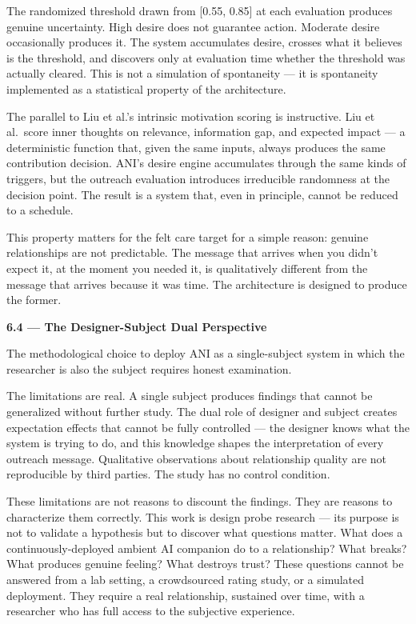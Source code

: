 The randomized threshold drawn from {[}0.55, 0.85{]} at each evaluation
produces genuine uncertainty. High desire does not guarantee action.
Moderate desire occasionally produces it. The system accumulates desire,
crosses what it believes is the threshold, and discovers only at
evaluation time whether the threshold was actually cleared. This is not
a simulation of spontaneity --- it is spontaneity implemented as a
statistical property of the architecture.

The parallel to Liu et al.'s intrinsic motivation scoring is
instructive. Liu et al.~score inner thoughts on relevance, information
gap, and expected impact --- a deterministic function that, given the
same inputs, always produces the same contribution decision. ANI's
desire engine accumulates through the same kinds of triggers, but the
outreach evaluation introduces irreducible randomness at the decision
point. The result is a system that, even in principle, cannot be reduced
to a schedule.

This property matters for the felt care target for a simple reason:
genuine relationships are not predictable. The message that arrives when
you didn't expect it, at the moment you needed it, is qualitatively
different from the message that arrives because it was time. The
architecture is designed to produce the former.

\textbf{6.4 --- The Designer-Subject Dual Perspective}

The methodological choice to deploy ANI as a single-subject system in
which the researcher is also the subject requires honest examination.

The limitations are real. A single subject produces findings that cannot
be generalized without further study. The dual role of designer and
subject creates expectation effects that cannot be fully controlled ---
the designer knows what the system is trying to do, and this knowledge
shapes the interpretation of every outreach message. Qualitative
observations about relationship quality are not reproducible by third
parties. The study has no control condition.

These limitations are not reasons to discount the findings. They are
reasons to characterize them correctly. This work is design probe
research --- its purpose is not to validate a hypothesis but to discover
what questions matter. What does a continuously-deployed ambient AI
companion do to a relationship? What breaks? What produces genuine
feeling? What destroys trust? These questions cannot be answered from a
lab setting, a crowdsourced rating study, or a simulated deployment.
They require a real relationship, sustained over time, with a researcher
who has full access to the subjective experience.

